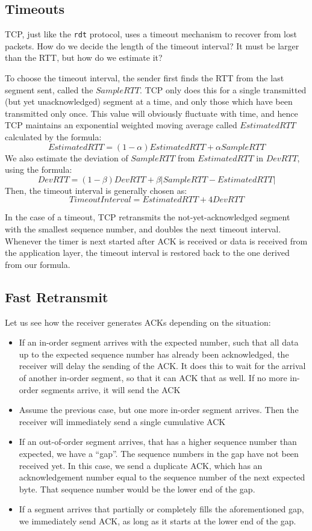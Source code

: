 \documentclass[12pt,letterpaper]{book}
\theoremstyle{definition}
\begin{document}
\subsection{Timeouts}

TCP, just like the \texttt{rdt} protocol, uses a timeout mechanism to recover from lost packets. How do  we decide the length of the timeout interval? It must be larger than the RTT, but how do we estimate it?

To choose the timeout interval, the sender first finds the RTT from the last segment sent, called the $SampleRTT$. TCP only does this for a single transmitted (but yet unacknowledged) segment at a time, and only those which have been transmitted only once. This value will obviously fluctuate with time, and hence TCP maintains an exponential weighted moving average called $EstimatedRTT$ calculated by the formula:
\[EstimatedRTT = (1-\alpha) EstimatedRTT + \alpha SampleRTT\]
We also estimate the deviation of $SampleRTT$ from $EstimatedRTT$ in $DevRTT$, using the formula:
\[DevRTT = (1-\beta)DevRTT + \beta |SampleRTT - EstimatedRTT|\]
Then, the timeout interval is generally chosen as:
\[TimeoutInterval = EstimatedRTT + 4 DevRTT\]

In the case of a timeout, TCP retransmits the not-yet-acknowledged segment with the smallest sequence number, and doubles the next timeout interval. Whenever the timer is next started after ACK is received or data is received from the application layer, the timeout interval is restored back to the one derived from our formula.

\subsection{Fast Retransmit}

Let us see how the receiver generates ACKs depending on the situation:

\begin{itemize}
  \item If an in-order segment arrives with the expected number, such that all data up to the expected sequence number has already been acknowledged, the receiver will delay the sending of the ACK. It does this to wait for the arrival of another in-order segment, so that it can ACK that as well. If no more in-order segments arrive, it will send the ACK
  \item Assume the previous case, but one more in-order segment arrives. Then the receiver will immediately send a single cumulative ACK
  \item If an out-of-order segment arrives, that has a higher sequence number than expected, we have a ``gap''. The sequence numbers in the gap have not been received yet. In this case, we send a duplicate ACK, which has an acknowledgement number equal to the sequence number of the next expected byte. That sequence number would be the lower end of the gap.
  \item If a segment arrives that partially or completely fills the aforementioned gap, we immediately send ACK, as long as it starts at the lower end of the gap.
\end{itemize}
\end{document}
